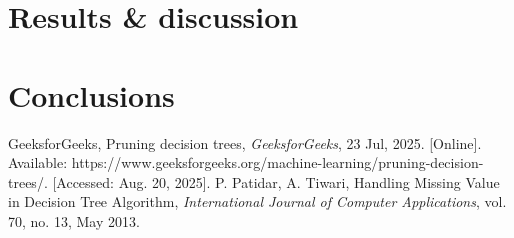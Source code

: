 \documentclass[conference]{IEEEtran}
\begin{document}
\section{Results \& discussion}

\section{Conclusions}

\begin{thebibliography}{00}
 GeeksforGeeks, Pruning decision trees, {\em GeeksforGeeks}, 23 Jul, 2025. [Online]. Available: https://www.geeksforgeeks.org/machine-learning/pruning-decision-trees/. [Accessed: Aug. 20, 2025].
 P. Patidar, A. Tiwari, Handling Missing Value in Decision Tree Algorithm, {\em International Journal of Computer Applications}, vol. 70, no. 13, May 2013.
\end{thebibliography}
\vspace{12pt}
\end{document}
